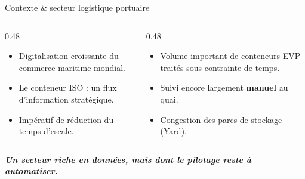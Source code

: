 \documentclass[aspectratio=169,french]{beamer}
\begin{document}
\begin{frame}{Contexte \& secteur logistique portuaire}
  \begin{columns}[t]
    \begin{column}{0.48\textwidth}
      \begin{tcolorbox}[cardstyle,title=\small\bfseries Le secteur en transformation]
        \small
        \begin{itemize}
          \item Digitalisation croissante du commerce maritime mondial.
          \item Le conteneur ISO : un flux d'information stratégique.
          \item Impératif de réduction du temps d'escale.
        \end{itemize}
      \end{tcolorbox}
    \end{column}
    
    \begin{column}{0.48\textwidth}
      \begin{tcolorbox}[cardstyle,title=\small\bfseries Le défi opérationnel]
        \small
        \begin{itemize}
          \item Volume important de conteneurs EVP traités sous contrainte de temps.
          \item Suivi encore largement \textbf{manuel} au quai.
          \item Congestion des parcs de stockage (Yard).
        \end{itemize}
      \end{tcolorbox}
    \end{column}
  \end{columns}
  
  \vspace{0.4cm}
  \begin{center}
    \small\bfseries\itshape\textcolor{RefBlue}{Un secteur riche en \textcolor{RefOrange}{données}, mais dont le pilotage reste à \textcolor{RefOrange}{automatiser}.}
  \end{center}
\end{frame}
\end{document}
